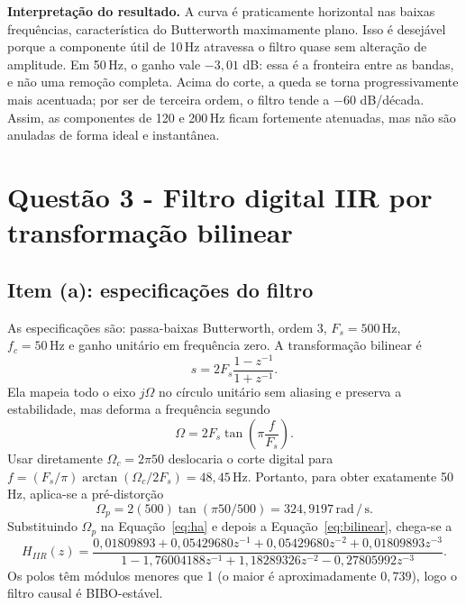 \documentclass[12pt,oneside,a4paper,chapter=TITLE,section=TITLE,brazil]{abntex2}
\newcommand{\SI}[2]{#1\,#2}
\newcommand{\hertz}{\ensuremath{\mathrm{Hz}}}
\newcommand{\radian}{\ensuremath{\mathrm{rad}}}
\newcommand{\second}{\ensuremath{\mathrm{s}}}
\newcommand{\per}{\ensuremath{\,/\,}}
\begin{document}
\noindent\textbf{Interpretação do resultado.} A curva é praticamente horizontal nas
baixas frequências, característica do Butterworth maximamente plano. Isso é desejável
porque a componente útil de \SI{10}{\hertz} atravessa o filtro quase sem alteração de
amplitude. Em \SI{50}{\hertz}, o ganho vale $-3{,}01$ dB: essa é a fronteira entre as
bandas, e não uma remoção completa. Acima do corte, a queda se torna progressivamente
mais acentuada; por ser de terceira ordem, o filtro tende a $-60$ dB/década. Assim, as
componentes de 120 e \SI{200}{\hertz} ficam fortemente atenuadas, mas não são anuladas
de forma ideal e instantânea.

\chapter{Questão 3 - Filtro digital IIR por transformação bilinear}
\section{Item (a): especificações do filtro}
As especificações são: passa-baixas Butterworth, ordem 3, $F_s=\SI{500}{\hertz}$,
$f_c=\SI{50}{\hertz}$ e ganho unitário em frequência zero. A transformação bilinear
é
\begin{equation}\label{eq:bilinear}
s=2F_s\frac{1-z^{-1}}{1+z^{-1}}.
\end{equation}
Ela mapeia todo o eixo $j\Omega$ no círculo unitário sem aliasing e preserva a
estabilidade, mas deforma a frequência segundo
\begin{equation}
\Omega=2F_s\tan\!\left(\pi\frac{f}{F_s}\right).
\end{equation}
Usar diretamente $\Omega_c=2\pi50$ deslocaria o corte digital para
$f=(F_s/\pi)\arctan(\Omega_c/2F_s)=\SI{48{,}45}{\hertz}$. Portanto, para obter exatamente
\SI{50}{\hertz}, aplica-se a pré-distorção
\begin{equation}
\Omega_p=2(500)\tan(\pi 50/500)=\SI{324{,}9197}{\radian\per\second}.
\end{equation}
Substituindo $\Omega_p$ na Equação~\eqref{eq:ha} e depois a
Equação~\eqref{eq:bilinear}, chega-se a
\begin{equation}\label{eq:iir}
H_{IIR}(z)=\frac{0{,}01809893+0{,}05429680z^{-1}+0{,}05429680z^{-2}+0{,}01809893z^{-3}}
{1-1{,}76004188z^{-1}+1{,}18289326z^{-2}-0{,}27805992z^{-3}}.
\end{equation}
Os polos têm módulos menores que 1 (o maior é aproximadamente $0{,}739$), logo o
filtro causal é BIBO-estável.
\end{document}
